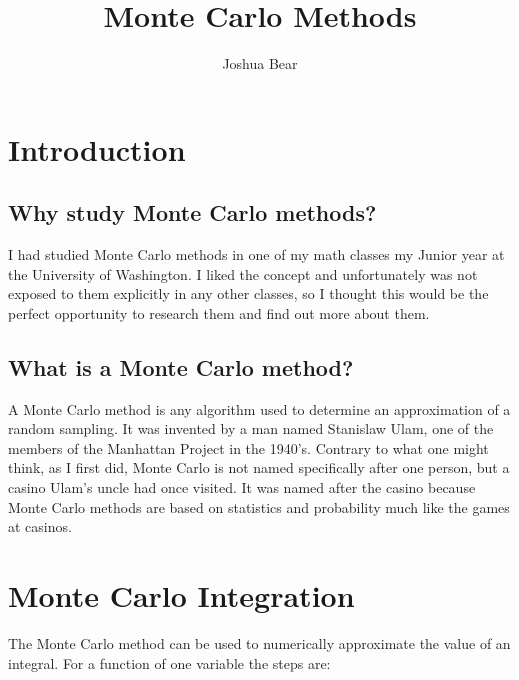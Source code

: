 \documentclass{article}
\title{Monte Carlo Methods}
\author{Joshua Bear}
\date{}
\begin{document}
\maketitle

\pagebreak
\tableofcontents
\pagebreak

\section{Introduction}

\subsection{Why study Monte Carlo methods?}

\hspace{4ex} I had studied Monte Carlo methods in one of my math classes my Junior year at the University of Washington. I liked the concept and unfortunately was not exposed to them explicitly in any other classes, so I thought this would be the perfect opportunity to research them and find out more about them. \\

\subsection{What is a Monte Carlo method?}

\hspace{4ex} A Monte Carlo method is any algorithm used to determine an approximation of a random sampling. It was invented by a man named Stanislaw Ulam, one of the members of the Manhattan Project in the 1940's. Contrary to what one might think, as I first did, Monte Carlo is not named specifically after one person, but a casino Ulam's uncle had once visited. It was named after the casino because Monte Carlo methods are based on statistics and probability much like the games at casinos. \\

\section{Monte Carlo Integration}
\hspace{4ex} The Monte Carlo method can be used to numerically approximate the value of an integral. For a function of one variable the steps are:
\end{document}
